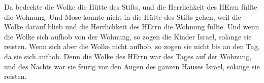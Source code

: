  Da bedeckte die Wolke die Hütte des Stifts, und die
Herrlichkeit des HErrn füllte die Wohnung.  Und Mose konnte
nicht in die Hütte des Stifts gehen, weil die Wolke darauf blieb und die
Herrlichkeit des HErrn die Wohnung füllte.  Und wenn die
Wolke sich aufhob von der Wohnung, so zogen die Kinder Israel, solange
sie reisten.  Wenn sich aber die Wolke nicht aufhob, so
zogen sie nicht bis an den Tag, da sie sich aufhob.  Denn
die Wolke des HErrn war des Tages auf der Wohnung, und des Nachts war
sie feurig vor den Augen des ganzen Hauses Israel, solange sie reisten.
